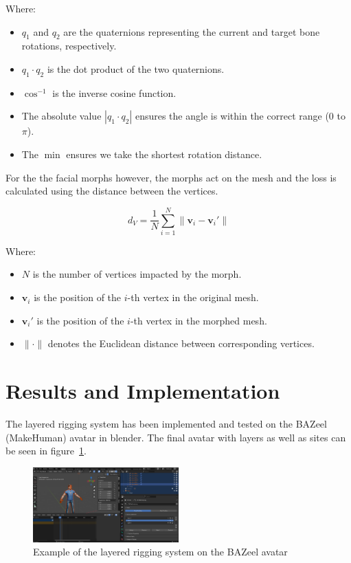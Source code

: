 \documentclass[../../main.tex]{subfiles}
\begin{document}
{Where:
\begin{itemize}
    \item \( q_1 \) and \( q_2 \) are the quaternions representing the current and target bone rotations, respectively.
    \item \( q_1 \cdot q_2 \) is the dot product of the two quaternions.
    \item \( \cos^{-1} \) is the inverse cosine function.
    \item The absolute value \( | q_1 \cdot q_2 | \) ensures the angle is within the correct range (0 to \( \pi \)).
    \item The \( \min \) ensures we take the shortest rotation distance.
\end{itemize}

For the the facial morphs however, the morphs act on the mesh and the loss is calculated using the distance between the vertices.

\[
d_V = \frac{1}{N} \sum_{i=1}^{N} \| \mathbf{v}_i - \mathbf{v}_i' \|
\]

Where:
\begin{itemize}
    \item \( N \) is the number of vertices impacted by the morph.
    \item \( \mathbf{v}_i \) is the position of the \( i \)-th vertex in the original mesh.
    \item \( \mathbf{v}_i' \) is the position of the \( i \)-th vertex in the morphed mesh.
    \item \( \|\cdot\| \) denotes the Euclidean distance between corresponding vertices.
\end{itemize}

\section{Results and Implementation}
\label{ch:avatar_creation_pose_synthesis:results}

The layered rigging system has been implemented and tested on the BAZeel (MakeHuman) avatar in blender. The final avatar with layers as well as sites can be seen in figure~\ref{fig:layers_example}.

\begin{figure}
    \centering
    \includegraphics[width=0.5\textwidth]{chapters/avatar_creation_pose_synthesis/images/layers_example.png}
    \caption{Example of the layered rigging system on the BAZeel avatar}
    \label{fig:layers_example}
\end{figure}

}
\end{document}
